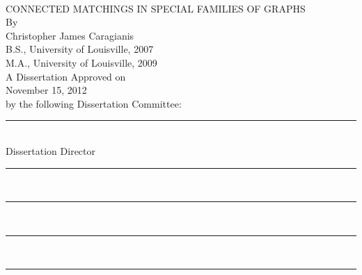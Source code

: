\vspace{1 in}
\begin{center}
~\\
\vspace{1in}
CONNECTED MATCHINGS IN SPECIAL FAMILIES OF GRAPHS\\
\vspace{0.25 in}
By\\
Christopher James Caragianis\\
B.S., University of Louisville, 2007\\
M.A., University of Louisville, 2009\\
\vspace{0.25 in}
A Dissertation Approved on \\
\vspace{0.75 in}
November 15, 2012\\
\vspace{0.75 in}
by the following Dissertation Committee:\\
\vspace{0.5 in}
\rule{3in}{0.3mm}\\
Dissertation Director\\
\vspace{0.4 in}
\rule{3in}{0.3mm}\\
\vspace{0.4 in}
\rule{3in}{0.3mm}\\
\vspace{0.4 in}
\rule{3in}{0.3mm}\\
\vspace{0.4 in}
\rule{3in}{0.3mm}
\end{center} 